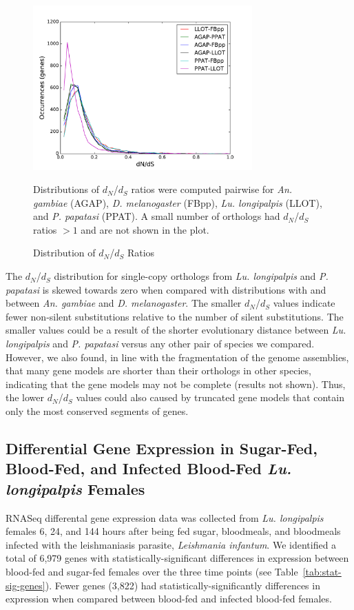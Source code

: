 \begin{figure}[H]
  \centering
  \caption{Distribution of $d_N$/$d_S$ Ratios}
  \includegraphics[width=0.75\textwidth]{figures/ka_ks/dN_dS}
  \label{fig:dnds-distr}

  Distributions of $d_N$/$d_S$ ratios were computed pairwise for \emph{An. gambiae} (AGAP), \emph{D. melanogaster} (FBpp), \emph{Lu. longipalpis} (LLOT), and \emph{P. papatasi} (PPAT). A small number of orthologs had $d_N$/$d_S$ ratios $>1$ and are not shown in the plot.
\end{figure}


The $d_N$/$d_S$ distribution for single-copy orthologs from \emph{Lu. longipalpis} and \emph{P. papatasi} is skewed towards zero when compared with distributions with and between \emph{An. gambiae} and \emph{D. melanogaster}.  The smaller $d_N$/$d_S$ values indicate fewer non-silent substitutions relative to the number of silent substitutions.  The smaller values could be a result of the shorter evolutionary distance between \emph{Lu. longipalpis} and \emph{P. papatasi} versus any other pair of species we compared.  However, we also found, in line with the fragmentation of the genome assemblies, that many gene models are shorter than their orthologs in other species, indicating that the gene models may not be complete (results not shown).  Thus, the lower $d_N$/$d_S$ values could also caused by truncated gene models that contain only the most conserved segments of genes.

\subsection{Differential Gene Expression in Sugar-Fed, Blood-Fed, and Infected Blood-Fed \emph{Lu. longipalpis} Females}
RNASeq differental gene expression data was collected from \emph{Lu. longipalpis} females 6, 24, and 144 hours after being fed sugar, bloodmeals, and bloodmeals infected with the leishmaniasis parasite, \emph{Leishmania infantum}.  We identified a total of 6,979 genes with statistically-significant differences in expression between blood-fed and sugar-fed females over the three time points (see Table~\ref{tab:stat-sig-genes}).  Fewer genes (3,822) had statistically-significantly differences in expression when compared between blood-fed and infected blood-fed females.

